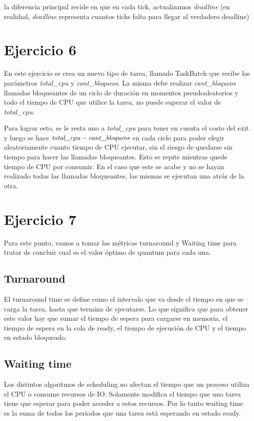 \documentclass[a4paper,11pt]{article}
\begin{document}
	la diferencia principal recide en que en cada tick, actualizamos \emph{deadline} (en realidad, \emph{deadline} representa cuantos ticks falta para llegar al verdadero deadline)
			
	

\section{Ejercicio 6}

En este ejercicio se crea un nuevo tipo de tarea, llamado TaskBatch que recibe los parámetros \emph{total\_cpu} y \emph{cant\_bloqueos}. La misma debe realizar \emph{cant\_bloqueos} llamadas bloqueantes de un ciclo de duración en momentos pseudoaleatorios y todo el tiempo de CPU que utilice la tarea, no puede superar el valor de \emph{total\_cpu}.

Para lograr esto, se le resta uno a \emph{total\_cpu} para tener en cuenta el costo del exit y luego se hace $\emph{total\_cpu} - \emph{cant\_bloqueos}$ en cada ciclo para poder elegir aleatoriamente cuanto tiempo de CPU ejecutar, sin el riesgo de quedarse sin tiempo para hacer las llamadas bloqueantes. Esto se repite mientras quede tiempo de CPU por consumir. En el caso que este se acabe y no se hayan realizado todas las llamadas bloqueantes, las mismas se ejecutan una atrás de la otra.



\section{Ejercicio 7}
Para este punto, vamos a tomar las métricas turnaround y Waiting time para tratar de concluir cual es el valor óptimo de quantum para cada una.

\subsection{Turnaround}
El turnaround time se define como el intervalo que va desde el tiempo en que se carga la tarea, hasta que termina de ejecutarse. Lo que significa que para obtener este valor hay que sumar el tiempo de espera para cargarse en memoria, el tiempo de espera en la cola de ready, el tiempo de ejecución de CPU y el tiempo en estado bloqueado.

\subsection{Waiting time}
Los distintos algoritmos de scheduling no afectan el tiempo que un proceso utiliza el CPU o consume recursos de IO. Solamente modifica el tiempo que una tarea tiene que esperar para poder acceder a estos recursos. Por lo tanto waiting time es la suma de todos los períodos que una tarea está esperando en estado ready.
\end{document}
